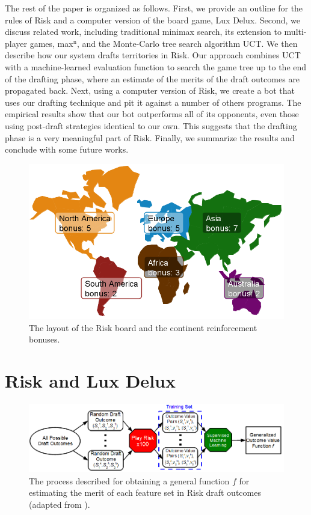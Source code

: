 \documentclass[letterpaper]{article}
\numberwithin{equation}{section}
\numberwithin{theorem}{section}
\numberwithin{lemma}{section}
\numberwithin{df}{section}
\begin{document}
The rest of the paper is organized as follows.  First, we provide an outline for the rules of Risk and a computer version of the board game, Lux Delux.  Second, we discuss related work, including traditional minimax search, its extension to multi-player games, max$^\text{n}$, and the Monte-Carlo tree search algorithm UCT.  We then describe how our system drafts territories in Risk.  Our approach combines UCT with a machine-learned evaluation function to search the game tree up to the end of the drafting phase, where an estimate of the merits of the draft outcomes are propagated back.  Next, using a computer version of Risk, we create a bot that uses our drafting technique and pit it against a number of others programs.  The empirical results show that our bot outperforms all of its opponents, even those using post-draft strategies identical to our own.  This suggests that the drafting phase is a very meaningful part of Risk.  Finally, we summarize the results and conclude with some future works.

\begin{figure}[t]
	\centering
	\includegraphics[scale=0.325]{../ForPublication/figs/Conts.png}
	\caption{The layout of the Risk board and the continent reinforcement bonuses.}
	\label{fig:Conts}
\end{figure}

\section{Risk and Lux Delux}
\label{sec:Prob}

\begin{figure}[t]
	\centering
	\includegraphics[scale=0.54]{../ForPublication/figs/MachineLearner.png}
	\caption{The process described for obtaining a general function $f$ for estimating the merit of each feature set in Risk draft outcomes (adapted from \cite[Figure 5.1]{GregLeeThesis}).}
	\label{fig:MachLearn}
\end{figure} 
\end{document}

